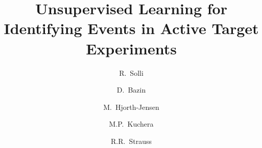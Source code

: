 \documentclass[review,sort&compress]{elsarticle}
\begin{document}
\begin{frontmatter}


\title{Unsupervised Learning  for Identifying  Events in Active Target  Experiments}


\author{R.~Solli}
\address{Expert Analytics AS, Tordenskiolds gate 6, 0160, Oslo, Norway}
\address{Department of Physics, University of Oslo, POB 1048 Oslo, N-0316 Oslo, Norway}
\author{D.~Bazin}
\address{Department of Physics and Astronomy and Facility for Rare Ion Beams and National Superconducting Cyclotron Facility, Michigan State University, East Lansing, MI 48824, USA}
\author{M.~Hjorth-Jensen}
\address{Department of Physics and Astronomy and Facility for Rare Ion Beams and National Superconducting Cyclotron Facility, Michigan State University, East Lansing, MI 48824, USA}
\address{Department of Physics and Center for Computing in Science Education, University of Oslo, POB 1048 Oslo, N-0316 Oslo, Norway}
\author{M.P.~Kuchera}
\address{Department of Physics, Davidson College, Davidson, North Carolina, USA}
\author{R.R.~Strauss}
\address{Department of Mathematics and Computer Science, Davidson College, Davidson, North Carolina, USA}
\address{Department of Computer Science, University of North Carolina, Chapel Hill, North Carolina, USA}






\end{frontmatter}
\end{document}
